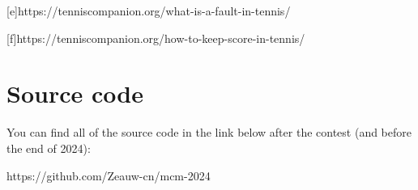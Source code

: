 \documentclass[UTF8]{mcmthesis}
\begin{document}
\begin{appendices}
    
    [e]https://tenniscompanion.org/what-is-a-fault-in-tennis/
    
    
    [f]https://tenniscompanion.org/how-to-keep-score-in-tennis/
  
    \section{Source code}
    
    You can find all of the source code in the link below after the contest (and before the end of 2024):
    
    https://github.com/Zeauw-cn/mcm-2024
   
    

    \end{appendices}
\end{document}
